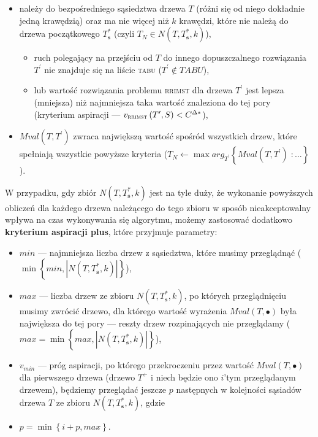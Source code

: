 \begin{itemize}
	\item należy do bezpośredniego sąsiedztwa drzewa $T$ (różni się od niego dokładnie jedną krawędzią) oraz ma nie więcej niż $k$ krawędzi, które nie należą do drzewa początkowego $T^{\ast}_{\textbf{s}}$ (czyli $T_{N} \in N \left( T, T^{\ast}_{\textbf{s}}, k \right)$),
	\begin{itemize}
		\item ruch polegający na przejściu od $T$ do innego dopuszczalnego rozwiązania $T^{\prime}$ nie znajduje się na liście \textsc{tabu} ($T^{\prime} \notin TABU$),
		\item lub wartość rozwiązania problemu \textsc{rrimst} dla drzewa $T^{\prime}$ jest lepsza (mniejsza) niż najmniejsza taka wartość znaleziona do tej pory (kryterium aspiracji --- $v_{\textsc{rrimst}} \left( T^{\prime}, S \right) < C^{\Delta\ast}$), 
	\end{itemize}
	\item $Mval \left( T, T^{\prime} \right)$ zwraca największą wartość spośród wszystkich drzew, które spełniają wszystkie powyższe kryteria ($T_{N} \leftarrow \max arg_{T^{\prime}} \left\{ Mval \left( T, T^{\prime} \right) \; : \dots \right\}$).
\end{itemize}

W przypadku, gdy zbiór $N \left( T, T^{\ast}_{\textbf{s}}, k \right)$ jest na tyle duży, że wykonanie powyższych obliczeń dla każdego drzewa należącego do tego zbioru w sposób nieakceptowalny wpływa na czas wykonywania się algorytmu, możemy zastosować dodatkowo \textbf{kryterium aspiracji plus}, które przyjmuje parametry:

\begin{itemize}
	\item $min$ --- najmniejsza liczba drzew z sąsiedztwa, które musimy przeglądnąć ($\min \left\{ min, \left| N \left( T, T^{\ast}_{\textbf{s}}, k \right) \right| \right\}$),
	\item $max$ --- liczba drzew ze zbioru $N \left( T, T^{\ast}_{\textbf{s}}, k \right)$, po których przeglądnięciu musimy zwrócić drzewo, dla którego wartość wyrażenia $Mval \left( T, \bullet \right)$ była największa do tej pory --- reszty drzew rozpinających nie przeglądamy ($max = \min \left\{ max, \left| N \left( T, T^{\ast}_{\textbf{s}}, k \right) \right| \right\}$),
	\item $v_{min}$ --- próg aspiracji, po którego przekroczeniu przez wartość $Mval \left( T, \bullet \right)$ dla pierwszego drzewa (drzewo $T^{+}$ i niech będzie ono $i$'tym przeglądanym drzewem), będziemy przeglądać jeszcze $p$ następnych w kolejności sąsiadów drzewa $T$ ze zbioru $N \left( T, T^{\ast}_{\textbf{s}}, k \right)$, gdzie
	\item $p = \min \left\{ i + p, max \right\}$.
\end{itemize}

